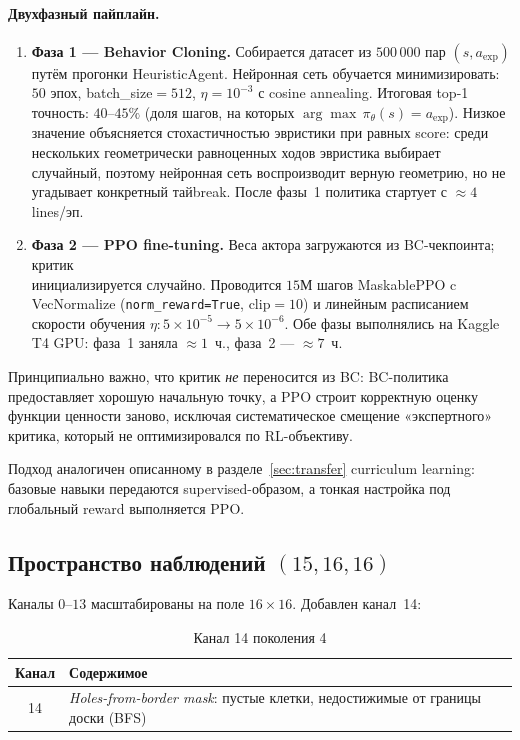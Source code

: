 \documentclass[12pt, a4paper]{article}
\begin{document}
\paragraph{Двухфазный пайплайн.}

\begin{enumerate}
  \item \textbf{Фаза 1 --- Behavior Cloning.} Собирается датасет из $500\,000$ пар $(s, a_{\text{exp}})$ путём прогонки HeuristicAgent. Нейронная сеть обучается минимизировать: $50$ эпох, batch\_size$=512$, $\eta=10^{-3}$ с cosine annealing. Итоговая top-1 точность: $40$--$45\%$ (доля шагов, на которых $\arg\max\,\pi_\theta(s) = a_{\text{exp}}$). Низкое значение объясняется стохастичностью эвристики при равных score: среди нескольких геометрически равноценных ходов эвристика выбирает случайный, поэтому нейронная сеть воспроизводит верную геометрию, но не угадывает конкретный тайbreak. После фазы~1 политика стартует с ${\approx}4$ lines/эп.

  \item \textbf{Фаза 2 --- PPO fine-tuning.} Веса актора загружаются из BC-чекпоинта; критик \\ инициализируется случайно. Проводится $15$М шагов MaskablePPO c VecNormalize (\texttt{norm\_reward=True}, clip$=10$) и линейным расписанием скорости обучения $\eta: 5\times10^{-5}\to5\times10^{-6}$. Обе фазы выполнялись на Kaggle T4 GPU: фаза~1 заняла ${\approx}1$~ч., фаза~2 --- ${\approx}7$~ч.
\end{enumerate}

Принципиально важно, что критик \textit{не} переносится из BC: BC-политика предоставляет хорошую начальную точку, а PPO строит корректную оценку функции ценности заново, исключая систематическое смещение «экспертного» критика, который не оптимизировался по RL-объективу.

Подход аналогичен описанному в разделе~\ref{sec:transfer} curriculum learning: базовые навыки передаются supervised-образом, а тонкая настройка под глобальный reward выполняется PPO.

\subsection{Пространство наблюдений $(15, 16, 16)$}

Каналы $0$--$13$ масштабированы на поле $16\times16$. Добавлен канал~14:

\begin{table}[H]
  \centering
  \caption{Канал 14 поколения 4}
  \label{tab:obs_gen4}
  \begin{tabular}{cl}
    \toprule
    \textbf{Канал} & \textbf{Содержимое} \\
    \midrule
    14 & \textit{Holes-from-border mask}: пустые клетки, недостижимые от границы доски (BFS) \\
    \bottomrule
  \end{tabular}
\end{table}
\end{document}
